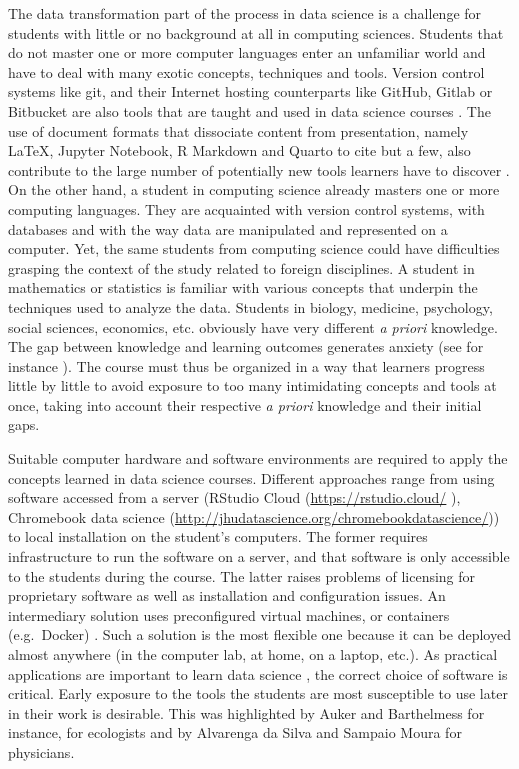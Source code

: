 \documentclass{aims}
\theoremstyle{definition}
\begin{document}
The data transformation part of the process in data science is a
challenge for students with little or no background at all in computing
sciences. Students that do not master one or more computer languages
enter an unfamiliar world and have to deal with many exotic concepts,
techniques and tools. Version control systems like git, and their
Internet hosting counterparts like GitHub, Gitlab or Bitbucket are also
tools that are taught and used in data science courses
\cite{Fiksel2019, Hsing2019}. The use of document formats that
dissociate content from presentation, namely LaTeX, Jupyter Notebook, R
Markdown and Quarto to cite but a few, also contribute to the large
number of potentially new tools learners have to discover
\cite{Baumer2014}. On the other hand, a student in computing science
already masters one or more computing languages. They are acquainted
with version control systems, with databases and with the way data are
manipulated and represented on a computer. Yet, the same students from
computing science could have difficulties grasping the context of the
study related to foreign disciplines. A student in mathematics or
statistics is familiar with various concepts that underpin the
techniques used to analyze the data. Students in biology, medicine,
psychology, social sciences, economics, etc. obviously have very
different \emph{a priori} knowledge. The gap between knowledge and
learning outcomes generates anxiety (see for instance
\cite{Onwuegbuzie2003}). The course must thus be organized in a way that
learners progress little by little to avoid exposure to too many
intimidating concepts and tools at once, taking into account their
respective \emph{a priori} knowledge and their initial gaps.

Suitable computer hardware and software environments are required to
apply the concepts learned in data science courses. Different approaches
range from using software accessed from a server \cite{Theobold2021}
(RStudio Cloud (\url{https://rstudio.cloud/} \cite{Rstudio2015}),
Chromebook data science
(\url{http://jhudatascience.org/chromebookdatascience/})) to local
installation on the student's computers. The former requires
infrastructure to run the software on a server, and that software is
only accessible to the students during the course. The latter raises
problems of licensing for proprietary software as well as installation
and configuration issues. An intermediary solution uses preconfigured
virtual machines, or containers (e.g.~Docker)
\cite{Cetinkaya-Rundel2018, Boettiger2015}. Such a solution is the most
flexible one because it can be deployed almost anywhere (in the computer
lab, at home, on a laptop, etc.). As practical applications are
important to learn data science \cite{Larwin2011}, the correct choice of
software is critical. Early exposure to the tools the students are most
susceptible to use later in their work is desirable. This was
highlighted by Auker and Barthelmess \cite{Auker2020} for instance, for
ecologists and by Alvarenga da Silva and Sampaio Moura
\cite{Alvarenga2020} for physicians.
\end{document}
